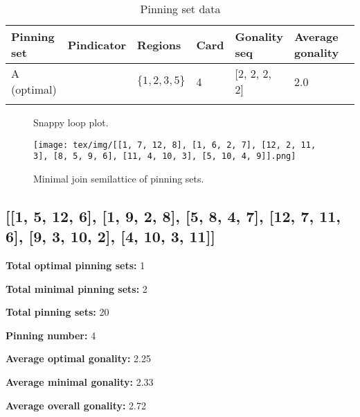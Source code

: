 \documentclass{article}%
\begin{document}
\begin{table}[ht]
	\caption{Pinning set data}
	\centering
	\renewcommand{\arraystretch}{1.5}
	\begin{tabularx}{\textwidth}{lXXXXXX}
		\toprule
			Pinning set & Pindicator & Regions & Card & Gonality seq & Average gonality\\
			\hline
			A (optimal) & {\Huge\textcolor{red0}{\textbullet}} & $\{1,2,3,5\}$ & 4 & [2, 2, 2, 2] & 2.0 \\
		\bottomrule \\ 
	\end{tabularx}
\end{table}

\newpage

\begin{multicols}{2}
\begin{figure}[H]
\centering
\def\svgscale{0.7}

\caption{Snappy loop plot.}
\label{fig:tex/img/[[1, 7, 12, 8], [1, 6, 2, 7], [12, 2, 11, 3], [8, 5, 9, 6], [11, 4, 10, 3], [5, 10, 4, 9]].svg}
\end{figure}
\columnbreak

\begin{figure}[H]
\centering
\texttt{[image: tex/img/[[1, 7, 12, 8], [1, 6, 2, 7], [12, 2, 11, 3], [8, 5, 9, 6], [11, 4, 10, 3], [5, 10, 4, 9]].png]}
\caption{Minimal join semilattice of pinning sets.}
\label{fig:tex/img/[[1, 7, 12, 8], [1, 6, 2, 7], [12, 2, 11, 3], [8, 5, 9, 6], [11, 4, 10, 3], [5, 10, 4, 9]].png}
\end{figure}
\end{multicols}

\newpage

\subsection{[[1, 5, 12, 6], [1, 9, 2, 8], [5, 8, 4, 7], [12, 7, 11, 6], [9, 3, 10, 2], [4, 10, 3, 11]]}

\begin{multicols}{2}
{\normalsize \noindent\textbf{Total optimal pinning sets:} 1

\noindent\textbf{Total minimal pinning sets:} 2

\noindent\textbf{Total pinning sets:} 20

\noindent\textbf{Pinning number:} 4

}
\columnbreak

{\normalsize \noindent\textbf{Average optimal gonality:} 2.25

\noindent\textbf{Average minimal gonality:} 2.33

\noindent\textbf{Average overall gonality:} 2.72

}
\end{multicols}
\end{document}
